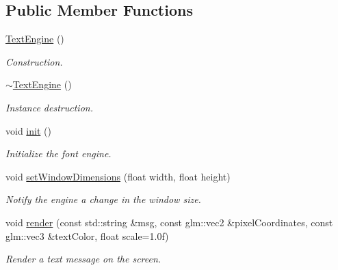 \subsection*{Public Member Functions}
\begin{DoxyCompactItemize}
\item 
\hyperlink{classTextEngine_aa3e16b1ce28b3d1d2ddd59f0510e5a36}{Text\+Engine} ()
\begin{DoxyCompactList}\small\item\em Construction. \end{DoxyCompactList}\item 
\hyperlink{classTextEngine_afbb0bf9af743b9b7f2b858929a4726f6}{$\sim$\+Text\+Engine} ()
\begin{DoxyCompactList}\small\item\em Instance destruction. \end{DoxyCompactList}\item 
void \hyperlink{classTextEngine_aaea1fe8ff3ec9bb7d880c5076c84e0fe}{init} ()
\begin{DoxyCompactList}\small\item\em Initialize the font engine. \end{DoxyCompactList}\item 
void \hyperlink{classTextEngine_ad4137c6a60ee7e2f1fbd27710697ab80}{set\+Window\+Dimensions} (float width, float height)
\begin{DoxyCompactList}\small\item\em Notify the engine a change in the window size. \end{DoxyCompactList}\item 
void \hyperlink{classTextEngine_a916007b7ab8d7c3206d185af91f15968}{render} (const std\+::string \&msg, const glm\+::vec2 \&pixel\+Coordinates, const glm\+::vec3 \&text\+Color, float scale=1.\+0f)
\begin{DoxyCompactList}\small\item\em Render a text message on the screen. \end{DoxyCompactList}\end{DoxyCompactItemize}
